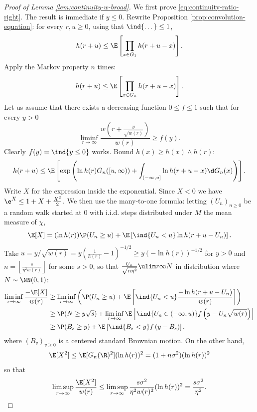 \documentclass[10pt,a4paper]{article}
\begin{document}
\begin{proof}[Proof of Lemma \ref{lem:continuity-w-broad}]
We first prove \eqref{eq:continuity-ratio-right}. The result is immediate if $y\leq 0$. 
Rewrite Proposition \ref{prop:convolution-equation}: for every $r,u\geq 0$, using that $\ind{\dots}\leq 1$,
\[ h(r+u) \leq \E\left[ \prod_{x\in G_1} h(r+u-x) \right] . \]
Apply the Markov property $n$ times:
\[ h(r+u) \leq \E\left[ \prod_{x\in G_n} h(r+u-x) \right] . \]
Let us assume that there exists a decreasing function $0\leq f \leq 1$ such that for every $y>0$
\begin{equation}
\liminf_{r\to\infty} \frac{w\left(r + \frac{y}{\sqrt{w(r)}}\right)}{w(r)} \geq f(y) .
\end{equation}
Clearly $f(y) = \ind{y\leq 0}$ works. 
Bound $h(x) \geq h(x) \wedge h(r)$:
\[ h(r+u) \leq \E\left[ \exp\left(\ln h(r) G_n([u,\infty)) + \int_{(-\infty, u]} \ln h(r+u-x) \d G_n(x) \right) \right] . \]
Write $X$ for the expression inside the exponential. 
Since $X<0$ we have $\e^{X} \leq 1 + X + \frac{X^2}{2}$. We then use %
the many-to-one formula: letting $(U_n)_{n\geq 0}$ be a random walk started at $0$ with i.i.d. steps distributed under $M$ the mean measure of $\chi$, 
\[ \E[X] = (\ln h(r)) \P(U_n\geq u) + \E\left[\ind{U_n<u} \ln h(r+u-U_n)\right] . \]
Take $u = y / \sqrt{w(r)} = y \left( \frac{1}{h(r)}-1\right)^{-1/2} \geq y (-\ln h(r))^{-1/2}$ for $y>0$ and $n = \left\lfloor \frac{s}{\eta^2 w(r)} \right\rfloor$ for some $s>0$, so that $\frac{U_n}{\sqrt{n\eta^2}} \ulim r \infty N$ in distribution where $N\sim\NN(0,1)$: 
\begin{align*}
\liminf_{r\to\infty} \frac{-\E[X]}{w(r)} &\geq \liminf_{r\to\infty} \left( \P(U_n\geq u) + \E\left[\ind{U_n<u} \frac{-\ln h(r+u-U_n)}{w(r)} \right] \right) \\
&\geq \P(N\geq y\sqrt{s}) + \liminf_{r\to\infty} \E\left[\ind{U_n\in(-\infty,u)} f\left(y - U_n\sqrt{w(r)}\right) \right] \\
&\geq \P(B_s\geq y) + \E\left[\ind{B_s<y} f\left(y - B_s\right) \right] .
\end{align*} 
where $(B_v)_{v\geq 0}$ is a centered standard Brownian motion. 
On the other hand, 
\[
\E[X^2] \leq \E[G_n(\R)^2] (\ln h(r))^2 = (1+n\sigma^2) (\ln h(r))^2
\]
so that 
\[ \limsup_{r\to\infty} \frac{\E[X^2]}{w(r)} \leq \limsup_{r\to\infty} \frac{s \sigma^2}{\eta^2 w(r)^2} (\ln h(r))^2 = \frac{s \sigma^2}{\eta^2} . \]

\end{proof}
\end{document}

